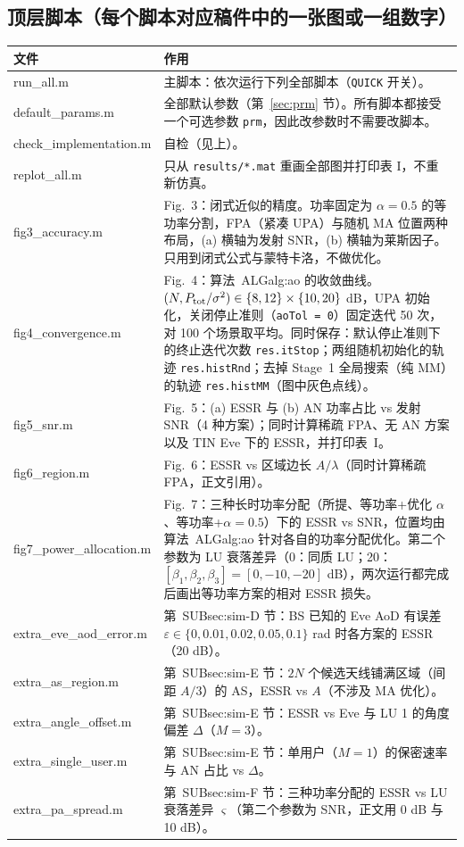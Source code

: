 \documentclass[11pt,a4paper]{ctexart}
\newcommand{\code}[1]{\texttt{#1}}
\newcommand{\Ptot}{P_{\rm tot}}
\begin{document}
\subsection{顶层脚本（每个脚本对应稿件中的一张图或一组数字）}
\begin{longtable}{>{\ttfamily\small}p{4.6cm}p{11.2cm}}
\toprule
文件 & 作用 \\ \midrule
run\_all.m & 主脚本：依次运行下列全部脚本（\code{QUICK} 开关）。\\
default\_params.m & 全部默认参数（第~\ref{sec:prm} 节）。所有脚本都接受一个可选参数 \code{prm}，因此改参数时不需要改脚本。\\
check\_implementation.m & 自检（见上）。\\
replot\_all.m & 只从 \code{results/*.mat} 重画全部图并打印表 I，不重新仿真。\\ \midrule
fig3\_accuracy.m & Fig.~3：闭式近似的精度。功率固定为 $\alpha=0.5$ 的等功率分割，FPA（紧凑 UPA）与随机 MA 位置两种布局，(a) 横轴为发射 SNR，(b) 横轴为莱斯因子。只用到闭式公式与蒙特卡洛，不做优化。\\
fig4\_convergence.m & Fig.~4：算法~ALG{alg:ao} 的收敛曲线。$(N,\Ptot/\sigma^2)\in\{8,12\}\times\{10,20\}$ dB，UPA 初始化，关闭停止准则（\code{aoTol = 0}）固定迭代 50 次，对 100 个场景取平均。同时保存：默认停止准则下的终止迭代次数 \code{res.itStop}；两组随机初始化的轨迹 \code{res.histRnd}；去掉 Stage~1 全局搜索（纯 MM）的轨迹 \code{res.histMM}（图中灰色点线）。\\
fig5\_snr.m & Fig.~5：(a) ESSR 与 (b) AN 功率占比 vs 发射 SNR（4 种方案）；同时计算稀疏 FPA、无 AN 方案以及 TIN Eve 下的 ESSR，并打印表~I。\\
fig6\_region.m & Fig.~6：ESSR vs 区域边长 $A/\lambda$（同时计算稀疏 FPA，正文引用）。\\
fig7\_power\_allocation.m & Fig.~7：三种长时功率分配（所提、等功率+优化 $\alpha$、等功率+$\alpha=0.5$）下的 ESSR vs SNR，位置均由算法~ALG{alg:ao} 针对各自的功率分配优化。第二个参数为 LU 衰落差异（0：同质 LU；20：$[\beta_1,\beta_2,\beta_3]=[0,-10,-20]$ dB），两次运行都完成后画出等功率方案的相对 ESSR 损失。\\ \midrule
extra\_eve\_aod\_error.m & 第~SUB{sec:sim}-D 节：BS 已知的 Eve AoD 有误差 $\varepsilon\in\{0,0.01,0.02,0.05,0.1\}$ rad 时各方案的 ESSR（20 dB）。\\
extra\_as\_region.m & 第~SUB{sec:sim}-E 节：$2N$ 个候选天线铺满区域（间距 $A/3$）的 AS，ESSR vs $A$（不涉及 MA 优化）。\\
extra\_angle\_offset.m & 第~SUB{sec:sim}-E 节：ESSR vs Eve 与 LU 1 的角度偏差 $\Delta$（$M=3$）。\\
extra\_single\_user.m & 第~SUB{sec:sim}-E 节：单用户（$M=1$）的保密速率与 AN 占比 vs $\Delta$。\\
extra\_pa\_spread.m & 第~SUB{sec:sim}-F 节：三种功率分配的 ESSR vs LU 衰落差异 $\varsigma$（第二个参数为 SNR，正文用 0 dB 与 10 dB）。\\
\bottomrule
\end{longtable}
\end{document}
